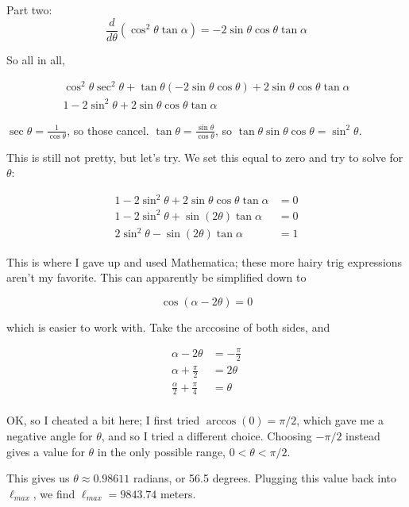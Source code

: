\documentclass[8.01x]{subfiles}
\begin{document}
Part two:
\begin{equation}
\frac{d}{d\theta} \left(\cos^2 \theta \tan \alpha\right) = -2 \sin \theta \cos \theta \tan \alpha
\end{equation}

So all in all,

\begin{align}
\cos^2\theta \sec^2 \theta + \tan \theta ( -2 \sin\theta \cos \theta) + 2 \sin \theta \cos \theta \tan \alpha\\
1 - 2\sin^2 \theta + 2 \sin \theta \cos \theta \tan \alpha
\end{align}

$\sec \theta = \frac{1}{\cos \theta}$, so those cancel. $\tan \theta = \frac{\sin\theta}{\cos\theta}$, so $\tan \theta \sin \theta \cos \theta = \sin^2\theta$.

This is still not pretty, but let's try. We set this equal to zero and try to solve for $\theta$:

\begin{align}
1 - 2\sin^2 \theta + 2 \sin \theta \cos \theta \tan \alpha &= 0\\
1 - 2\sin^2 \theta + \sin(2\theta) \tan \alpha &= 0\\
2\sin^2 \theta - \sin(2\theta) \tan \alpha &= 1
\end{align}

This is where I gave up and used Mathematica; these more hairy trig expressions aren't my favorite. This can apparently be simplified down to 

\begin{equation}
\cos (\alpha - 2 \theta) = 0
\end{equation}

which is easier to work with. Take the arccosine of both sides, and

\begin{align}
\alpha - 2 \theta &= -\frac{\pi}{2}\\
\alpha + \frac{\pi}{2} &= 2 \theta\\
\frac{\alpha}{2} + \frac{\pi}{4} &= \theta\\
\end{align}

OK, so I cheated a bit here; I first tried $\arccos(0) = \pi/2$, which gave me a negative angle for $\theta$, and so I tried a different choice. Choosing $-\pi/2$ instead gives a value for $\theta$ in the only possible range, $0 < \theta < \pi/2$.

This gives us $\theta \approx 0.98611$ radians, or 56.5 degrees. Plugging this value back into $\ell_{max}$, we find $\ell_{max} = 9843.74$ meters.
\end{document}

